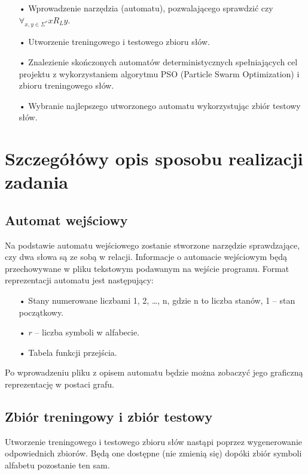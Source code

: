 \documentclass[runningheads,a4paper]{llncs}
\begin{document}
\begin{itemize}
\item[•] Wprowadzenie narzędzia (automatu), pozwalającego sprawdzić czy $\forall_{x,y \in \Sigma^*} x R_{L} y$.
\item[•] Utworzenie treningowego i testowego zbioru słów.
\item[•] Znalezienie skończonych automatów deterministycznych spełniających cel projektu z wykorzystaniem algorytmu PSO (Particle Swarm Optimization) i zbioru treningowego słów.
\item[•] Wybranie najlepszego utworzonego automatu wykorzystując zbiór testowy słów.
\end{itemize}

\newpage

\section{Szczegółówy opis sposobu realizacji zadania}

\subsection{Automat wejściowy}

Na podstawie automatu wejściowego zostanie stworzone narzędzie sprawdzające, czy dwa słowa są ze sobą w relacji. Informacje o automacie wejściowym będą przechowywane w pliku tekstowym podawanym na wejście programu. Format reprezentacji automatu jest następujący:

\begin{itemize}
\item[•] Stany numerowane liczbami 1, 2, …, n, gdzie n to liczba stanów, 1 – stan początkowy.
\item[•] $r$ – liczba symboli w alfabecie.
\item[•] Tabela funkcji przejścia.
\end{itemize}

Po wprowadzeniu pliku z opisem automatu będzie można zobaczyć jego graficzną reprezentację w postaci grafu.

\subsection{Zbiór treningowy i zbiór testowy}

Utworzenie treningowego i testowego zbioru słów nastąpi poprzez wygenerowanie odpowiednich zbiorów. Będą one dostępne (nie zmienią się) dopóki zbiór symboli alfabetu pozostanie ten sam. \\
\end{document}
